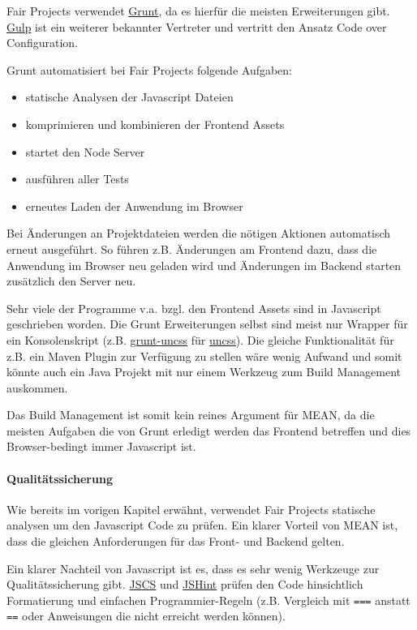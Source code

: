 \documentclass[]{article}
\begin{document}
Fair Projects verwendet \href{gruntjs.com}{Grunt}, da es hierfür die
meisten Erweiterungen gibt. \href{http://gulpjs.com/}{Gulp} ist ein
weiterer bekannter Vertreter und vertritt den Ansatz Code over
Configuration.

Grunt automatisiert bei Fair Projects folgende Aufgaben:

\begin{itemize}
\itemsep1pt\parskip0pt
\item
  statische Analysen der Javascript Dateien
\item
  komprimieren und kombinieren der Frontend Assets
\item
  startet den Node Server
\item
  ausführen aller Tests
\item
  erneutes Laden der Anwendung im Browser
\end{itemize}

Bei Änderungen an Projektdateien werden die nötigen Aktionen automatisch
erneut ausgeführt. So führen z.B. Änderungen am Frontend dazu, dass die
Anwendung im Browser neu geladen wird und Änderungen im Backend starten
zusätzlich den Server neu.

Sehr viele der Programme v.a. bzgl. den Frontend Assets sind in
Javascript geschrieben worden. Die Grunt Erweiterungen selbst sind meist
nur Wrapper für ein Konsolenskript (z.B.
\href{https://github.com/addyosmani/grunt-uncss}{grunt-uncss} für
\href{https://github.com/giakki/uncss}{uncss}). Die gleiche
Funktionalität für z.B. ein Maven Plugin zur Verfügung zu stellen wäre
wenig Aufwand und somit könnte auch ein Java Projekt mit nur einem
Werkzeug zum Build Management auskommen.

Das Build Management ist somit kein reines Argument für MEAN, da die
meisten Aufgaben die von Grunt erledigt werden das Frontend betreffen
und dies Browser-bedingt immer Javascript ist.

\paragraph{Qualitätssicherung}\label{qualituxe4tssicherung}

Wie bereits im vorigen Kapitel erwähnt, verwendet Fair Projects
statische analysen um den Javascript Code zu prüfen. Ein klarer Vorteil
von MEAN ist, dass die gleichen Anforderungen für das Front- und Backend
gelten.

Ein klarer Nachteil von Javascript ist es, dass es sehr wenig Werkzeuge
zur Qualitätssicherung gibt. \href{http://jscs.info/}{JSCS} und
\href{http://jshint.com/}{JSHint} prüfen den Code hinsichtlich
Formatierung und einfachen Programmier-Regeln (z.B. Vergleich mit
\texttt{===} anstatt \texttt{==} oder Anweisungen die nicht erreicht
werden können).
\end{document}
